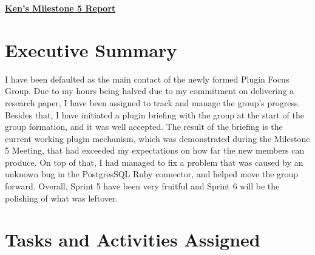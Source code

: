 
\begin{center}
{\large\textbf{\underline{{Ken's Milestone 5 Report}}}}
\end{center}

\section*{Executive Summary}

I have been defaulted as the main contact of the newly formed Plugin Focus Group. Due to my hours being halved due to my commitment on delivering a research paper, I have been assigned to track and manage the group's progress. Besides that, I have initiated a plugin briefing with the group at the start of the group formation, and it was well accepted. The result of the briefing is the current working plugin mechanism, which was demonstrated during the Milestone 5 Meeting, that had exceeded my expectations on how far the new members can produce. On top of that, I had managed to fix a problem that was caused by an unknown bug in the PostgresSQL Ruby connector, and helped move the group forward. Overall, Sprint 5 have been very fruitful and Sprint 6 will be the polishing of what was leftover. 

\section*{Tasks and Activities Assigned}

